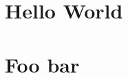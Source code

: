 \documentclass{article}
\begin{document}
\tableofcontents
\section{Hello World}
\section{Foo bar}
\end{document}
